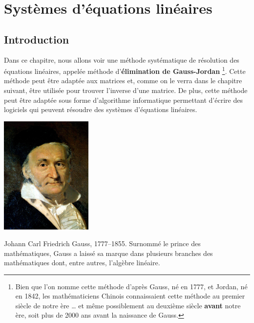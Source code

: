 \chapter{Systèmes d'équations linéaires}

%
\section{Introduction}

Dans ce chapitre, nous allons voir une méthode systématique de résolution
des équations linéaires, appelée méthode d'\textbf{élimination de Gauss-Jordan}%
\footnote{Bien que l'on nomme cette méthode d'après Gauss, né en 1777, et Jordan, né en 1842, 
les mathématiciens Chinois connaissaient cette méthode au premier siècle de notre ère \ldots
et même possiblement au deuxième siècle {\bfseries avant} notre ère, 
soit plus de 2000 ans avant la naissance de Gauss.}.
Cette méthode peut être adaptée aux matrices et, comme on le verra dans le chapitre
suivant, être utilisée pour trouver l'inverse d'une matrice.  
De plus, cette méthode peut être adaptée sous forme d'algorithme informatique
permettant d'écrire des logiciels qui peuvent résoudre des systèmes d'équations linéaires.
%
\begin{marginfigure}
\includegraphics[width=1.8in]{images/gauss.jpg}
\caption{Johann Carl Friedrich Gauss, 1777--1855.  Surnommé le prince des mathématiques,
Gauss a laissé sa marque dans plusieurs branches des mathématiques dont,
entre autres, l'algèbre linéaire.}\label{image:gauss}
\end{marginfigure}
%


